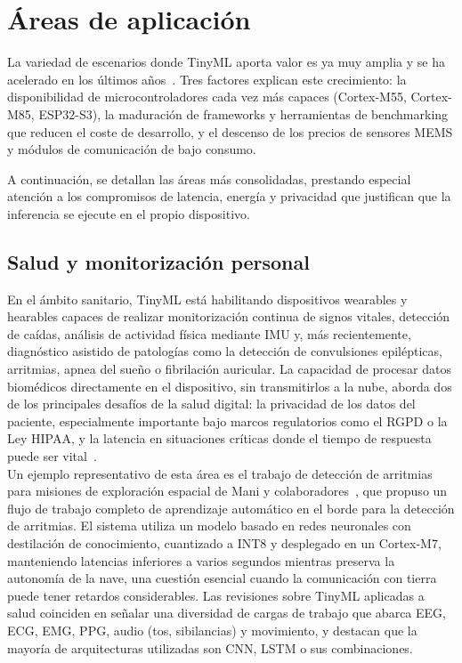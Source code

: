 \documentclass[a4paper,12pt,twoside,final]{book}
\begin{document}
\section{Áreas de aplicación}
La variedad de escenarios donde TinyML aporta valor es ya muy amplia y se ha acelerado en los últimos
años~\cite{lin2023ieeemcas,abadade2023ieeeaccess,somvanshi2025acm}. Tres factores explican este crecimiento: la
disponibilidad de microcontroladores cada vez más capaces (Cortex-M55, Cortex-M85, ESP32-S3), la maduración de
frameworks y herramientas de benchmarking que reducen el coste de desarrollo, y el descenso de los precios de
sensores MEMS y módulos de comunicación de bajo consumo.

A continuación, se detallan las áreas más consolidadas, prestando especial atención a los compromisos de latencia,
energía y privacidad que justifican que la inferencia se ejecute en el propio dispositivo.

\subsection{Salud y monitorización personal}
En el ámbito sanitario, TinyML está habilitando dispositivos wearables y hearables capaces de realizar
monitorización continua de signos vitales, detección de caídas, análisis de actividad física mediante IMU y, más
recientemente, diagnóstico asistido de patologías como la detección de convulsiones epilépticas, arritmias, apnea
del sueño o fibrilación auricular. La capacidad de procesar datos biomédicos directamente en el dispositivo, sin
transmitirlos a la nube, aborda dos de los principales desafíos de la salud digital: la privacidad de los datos del
paciente, especialmente importante bajo marcos regulatorios como el RGPD o la Ley HIPAA, y la latencia en
situaciones críticas donde el tiempo de respuesta puede ser vital~\cite{lin2023ieeemcas}.\\

Un ejemplo representativo de esta área es el trabajo de detección de arritmias para misiones de exploración
espacial de Mani y colaboradores~\cite{mani2024npjmicrogravity}, que propuso un flujo de trabajo completo de
aprendizaje automático en el borde para la detección de arritmias. El sistema utiliza un modelo basado en redes
neuronales con destilación de conocimiento, cuantizado a INT8 y desplegado en un Cortex-M7, manteniendo latencias
inferiores a varios segundos mientras preserva la autonomía de la nave, una cuestión esencial cuando la comunicación
con tierra puede tener retardos considerables. Las revisiones sobre TinyML aplicadas a salud coinciden en señalar
una diversidad de cargas de trabajo que abarca EEG, ECG, EMG, PPG, audio (tos, sibilancias) y movimiento, y destacan
que la mayoría de arquitecturas utilizadas son CNN, LSTM o sus combinaciones.
\end{document}

